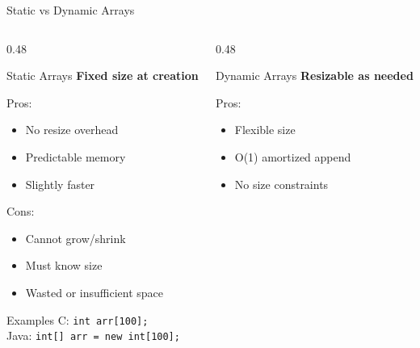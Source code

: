 \documentclass[aspectratio=169,xcolor=dvipsnames]{beamer}
\begin{document}
\begin{frame}{Static vs Dynamic Arrays}
  \begin{columns}
    \begin{column}{0.48\textwidth}
      \begin{block}{Static Arrays}
        \textbf{Fixed size at creation}

        \vspace{0.2cm}

        Pros:
        \begin{itemize}
          \item[$\checkmark$] No resize overhead
          \item[$\checkmark$] Predictable memory
          \item[$\checkmark$] Slightly faster
        \end{itemize}

        \vspace{0.2cm}

        Cons:
        \begin{itemize}
          \item[$\times$] Cannot grow/shrink
          \item[$\times$] Must know size
          \item[$\times$] Wasted or insufficient space
        \end{itemize}
      \end{block}

      \vspace{0.2cm}

      \begin{exampleblock}{Examples}
        C: \texttt{int arr[100];} \\
        Java: \texttt{int[] arr = new int[100];}
      \end{exampleblock}
    \end{column}
    \begin{column}{0.48\textwidth}
      \begin{block}{Dynamic Arrays}
        \textbf{Resizable as needed}

        \vspace{0.2cm}

        Pros:
        \begin{itemize}
          \item[$\checkmark$] Flexible size
          \item[$\checkmark$] O(1) amortized append
          \item[$\checkmark$] No size constraints
        \end{itemize}


\end{block}
\end{column}
\end{columns}
\end{frame}
\end{document}
